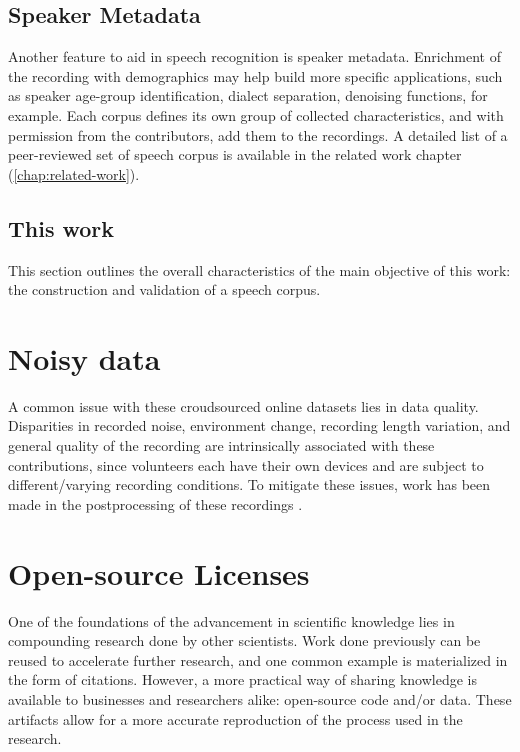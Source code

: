 \subsection{Speaker Metadata}

Another feature to aid in speech recognition is speaker metadata. Enrichment of the recording with demographics may help build more specific applications, such as speaker age-group identification, dialect separation, denoising functions, for example. Each corpus defines its own group of collected characteristics, and with permission from the contributors, add them to the recordings. A detailed list of a peer-reviewed set of speech corpus is available in the related work chapter (\ref{chap:related-work}).

\subsection{This work}

This section outlines the overall characteristics of the main objective of this work: the construction and validation of a speech corpus.

\section{Noisy data}

A common issue with these croudsourced online datasets lies in data quality. Disparities in recorded noise, environment change, recording length variation, and general quality of the recording are intrinsically associated with these contributions, since volunteers each have their own devices and are subject to different/varying recording conditions. To mitigate these issues, work has been made in the postprocessing of these recordings \cite{krishna2019speech}.

\section{Open-source Licenses}

One of the foundations of the advancement in scientific knowledge lies in compounding research done by other scientists. Work done previously can be reused to accelerate further research, and one common example is materialized in the form of citations. However, a more practical way of sharing knowledge is available to businesses and researchers alike: open-source code and/or data. These artifacts allow for a more accurate reproduction of the process used in the research.

